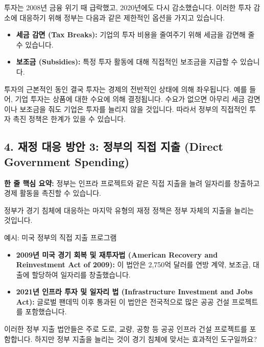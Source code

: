 \documentclass[11pt,a4paper]{article}
\begin{document}
투자는 2008년 금융 위기 때 급락했고, 2020년에도 다시 감소했습니다. 이러한 투자 감소에 대응하기 위해 정부는 다음과 같은 제한적인 옵션을 가지고 있습니다.

\begin{itemize}
    \item \textbf{세금 감면 (Tax Breaks):} 기업의 투자 비용을 줄여주기 위해 세금을 감면해 줄 수 있습니다.
    \item \textbf{보조금 (Subsidies):} 특정 투자 활동에 대해 직접적인 보조금을 지급할 수 있습니다.
\end{itemize}

\begin{cautionbox}{투자의 근본적인 동인}
    결국 투자는 경제의 전반적인 상태에 의해 좌우됩니다. 예를 들어, 기업 투자는 상품에 대한 수요에 의해 결정됩니다. 수요가 없으면 아무리 세금 감면이나 보조금을 줘도 기업은 투자를 늘리지 않을 것입니다. 따라서 정부의 직접적인 투자 촉진 정책은 한계가 있을 수 있습니다.
\end{cautionbox}

\subsection*{4. 재정 대응 방안 3: 정부의 직접 지출 (Direct Government Spending)}

\begin{tcolorbox}[mybox={정부 지출의 역할}]
    \textbf{한 줄 핵심 요약:} 정부는 인프라 프로젝트와 같은 직접 지출을 늘려 일자리를 창출하고 경제 활동을 촉진할 수 있습니다.
\end{tcolorbox}

정부가 경기 침체에 대응하는 마지막 유형의 재정 정책은 정부 자체의 지출을 늘리는 것입니다.

\begin{examplebox}{예시: 미국 정부의 직접 지출 프로그램}
    \begin{itemize}
        \item \textbf{2009년 미국 경기 회복 및 재투자법 (American Recovery and Reinvestment Act of 2009):} 이 법안은 2,750억 달러를 연방 계약, 보조금, 대출에 할당하여 일자리를 창출했습니다.
        \item \textbf{2021년 인프라 투자 및 일자리 법 (Infrastructure Investment and Jobs Act):} 글로벌 팬데믹 이후 통과된 이 법안은 전국적으로 많은 공공 건설 프로젝트를 포함했습니다.
    \end{itemize}
\end{examplebox}

이러한 정부 지출 법안들은 주로 도로, 교량, 공항 등 공공 인프라 건설 프로젝트를 포함합니다. 하지만 정부 지출을 늘리는 것이 경기 침체에 맞서는 효과적인 도구일까요?
\end{document}
